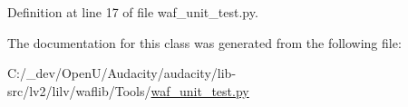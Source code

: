 Definition at line 17 of file waf\+\_\+unit\+\_\+test.\+py.



The documentation for this class was generated from the following file\+:\begin{DoxyCompactItemize}
\item 
C\+:/\+\_\+dev/\+Open\+U/\+Audacity/audacity/lib-\/src/lv2/lilv/waflib/\+Tools/\hyperlink{lilv_2waflib_2_tools_2waf__unit__test_8py}{waf\+\_\+unit\+\_\+test.\+py}\end{DoxyCompactItemize}
